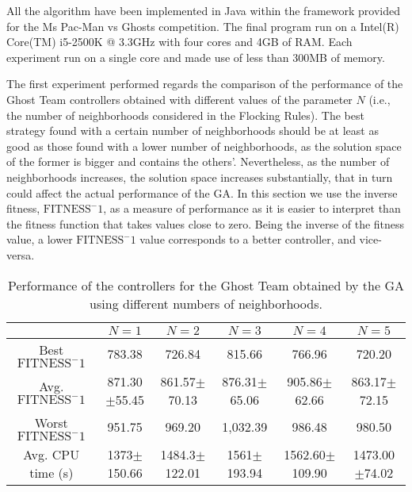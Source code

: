 \documentclass{llncs}
\begin{document}
All the algorithm have been implemented in Java within the framework provided for the Ms Pac-Man vs Ghosts competition. The final program run on a Intel(R) Core(TM) i5-2500K @ 3.3GHz with four cores and 4GB of RAM. Each experiment run on a single core and made use of less than 300MB of memory.


The first experiment performed regards the comparison of the performance of the Ghost Team controllers obtained with different values of the parameter $N$ (i.e., the number of neighborhoods considered in the Flocking Rules). The best strategy found with a certain number of neighborhoods should be at least as good as those found with a lower number of neighborhoods, as the solution space of the former is bigger and contains the others'. Nevertheless, as the number of neighborhoods increases, the solution space increases substantially, that in turn could affect the actual performance of the GA. In this section we use the inverse fitness, $\mathrm{FITNESS}^-1$, as a measure of performance as it is easier to interpret than the fitness function that takes values close to zero. Being the inverse of the fitness value, a lower $\mathrm{FITNESS}^-1$ value corresponds to a better controller, and vice-versa. 

\begin{small}
\begin{table} [htbp]
\centering
{
\begin{tabular}{|c||c|c|c|c|c|}
\hline & $N = 1$ & $N = 2$ & $N = 3$ & $N = 4$ & $N = 5$ \\
\hline
Best $\mathrm{FITNESS}^-1$& 783.38 & 726.84 & 815.66 & 766.96 & 720.20 \\
\hline
Avg. $\mathrm{FITNESS}^-1$& 871.30$\pm$55.45 & 861.57$\pm$70.13 & 876.31$\pm$65.06 & 905.86$\pm$62.66 & 863.17$\pm$72.15 \\
\hline
Worst $\mathrm{FITNESS}^-1$ & 951.75 & 969.20 & 1,032.39 & 986.48 & 980.50 \\
\hline
Avg. CPU time (s)& 1373$\pm$150.66 & 1484.3$\pm$122.01 & 1561$\pm$193.94 & 1562.60$\pm$109.90 & 1473.00$\pm$74.02 \\
\hline
\end{tabular}}
\caption{Performance of the controllers for the Ghost Team obtained by the GA using different numbers of neighborhoods.
\label{tab:results_GA}}
\end{table}
\end{small}
\end{document}
